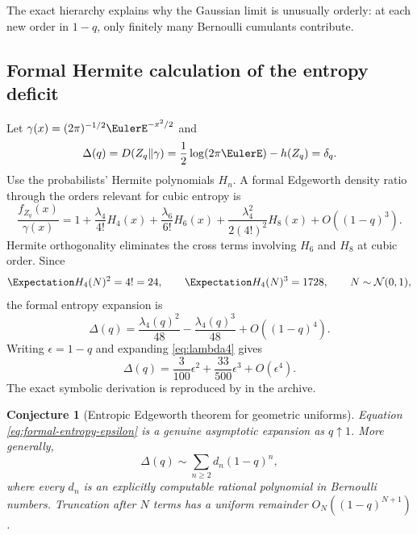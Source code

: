 \documentclass[11pt,oneside]{article}
\newtheorem{conjecture}[theorem]{Conjecture}
\theoremstyle{definition}
\theoremstyle{remark}
\begin{document}
The exact hierarchy explains why the Gaussian limit is unusually orderly: at
each new order in $1-q$, only finitely many Bernoulli cumulants contribute.

\subsection{Formal Hermite calculation of the entropy deficit}

Let $\gamma(x)=(2\pi)^{-1/2}\EulerE^{-x^2/2}$ and
\begin{equation}
 \Delta(q)=D(Z_q\|\gamma)
 =\frac12\log(2\pi\EulerE)-h(Z_q)
 =\delta_q.
 \label{eq:standardized-deficit}
\end{equation}
Use the probabilists' Hermite polynomials $H_n$.  A formal Edgeworth density ratio
through the orders relevant for cubic entropy is
\begin{equation}
 \frac{f_{Z_q}(x)}{\gamma(x)}
 =1+\frac{\lambda_4}{4!}H_4(x)
   +\frac{\lambda_6}{6!}H_6(x)
   +\frac{\lambda_4^2}{2(4!)^2}H_8(x)
   +O((1-q)^3).
 \label{eq:formal-Edgeworth}
\end{equation}
Hermite orthogonality eliminates the cross terms involving $H_6$ and $H_8$ at
cubic order.  Since
\begin{equation}
 \Expectation H_4(N)^2=4!=24,
 \qquad
 \Expectation H_4(N)^3=1728,
 \qquad N\sim\mathcal N(0,1),
 \label{eq:H4-moments}
\end{equation}
the formal entropy expansion is
\begin{equation}
 \Delta(q)
 =\frac{\lambda_4(q)^2}{48}
  -\frac{\lambda_4(q)^3}{48}
  +O((1-q)^4).
 \label{eq:formal-entropy-lambda}
\end{equation}
Writing $\epsilon=1-q$ and expanding \eqref{eq:lambda4} gives
\begin{equation}
 \boxed{
 \Delta(q)
 =\frac3{100}\epsilon^2
  +\frac{33}{500}\epsilon^3
  +O(\epsilon^4).}
 \label{eq:formal-entropy-epsilon}
\end{equation}
The exact symbolic derivation is reproduced by
 in the archive.

\begin{conjecture}[Entropic Edgeworth theorem for geometric uniforms]
\label{conj:entropic-edgeworth}
Equation \eqref{eq:formal-entropy-epsilon} is a genuine asymptotic expansion as
$q\uparrow1$.  More generally,
\begin{equation}
 \Delta(q)\sim\sum_{n\ge2}d_n(1-q)^n,
 \label{eq:full-entropic-series}
\end{equation}
where every $d_n$ is an explicitly computable rational polynomial in Bernoulli
numbers.  Truncation after $N$ terms has a uniform remainder
$O_N((1-q)^{N+1})$.
\end{conjecture}
\end{document}
